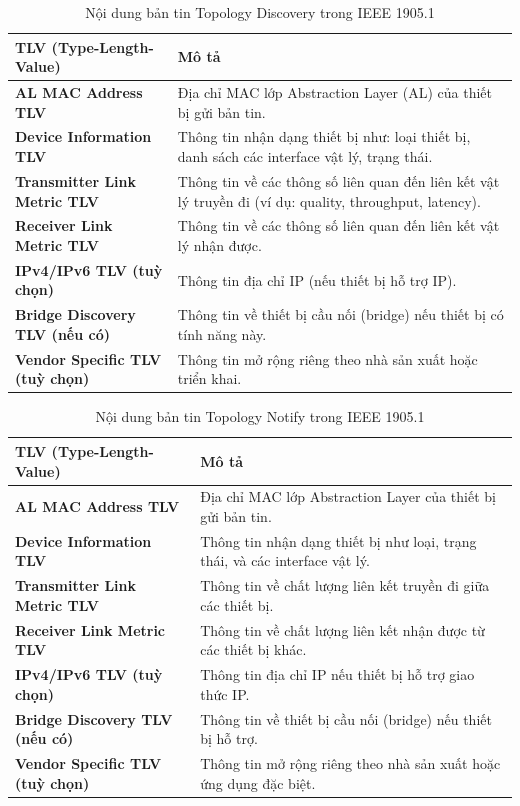 \begin{table}[ht]
    \centering
    \caption{Nội dung bản tin Topology Discovery trong IEEE 1905.1}
    \begin{tabular}{|>{\raggedright\arraybackslash}m{5cm}|>{\raggedright\arraybackslash}m{8cm}|}
    \hline
    \textbf{TLV (Type-Length-Value)} & \textbf{Mô tả} \\
    \hline
    \textbf{AL MAC Address TLV} & Địa chỉ MAC lớp Abstraction Layer (AL) của thiết bị gửi bản tin. \\
    \hline
    \textbf{Device Information TLV} & Thông tin nhận dạng thiết bị như: loại thiết bị, danh sách các interface vật lý, trạng thái. \\
    \hline
    \textbf{Transmitter Link Metric TLV} & Thông tin về các thông số liên quan đến liên kết vật lý truyền đi (ví dụ: quality, throughput, latency). \\
    \hline
    \textbf{Receiver Link Metric TLV} & Thông tin về các thông số liên quan đến liên kết vật lý nhận được. \\
    \hline
    \textbf{IPv4/IPv6 TLV (tuỳ chọn)} & Thông tin địa chỉ IP (nếu thiết bị hỗ trợ IP). \\
    \hline
    \textbf{Bridge Discovery TLV (nếu có)} & Thông tin về thiết bị cầu nối (bridge) nếu thiết bị có tính năng này. \\
    \hline
    \textbf{Vendor Specific TLV (tuỳ chọn)} & Thông tin mở rộng riêng theo nhà sản xuất hoặc triển khai. \\
    \hline
    \end{tabular}
\end{table}
    
\begin{table}[ht]
    \centering
    \caption{Nội dung bản tin Topology Notify trong IEEE 1905.1}
    \begin{tabular}{|>{\raggedright\arraybackslash}m{5cm}|>{\raggedright\arraybackslash}m{8cm}|}
    \hline
    \textbf{TLV (Type-Length-Value)} & \textbf{Mô tả} \\
    \hline
    \textbf{AL MAC Address TLV} & Địa chỉ MAC lớp Abstraction Layer của thiết bị gửi bản tin. \\
    \hline
    \textbf{Device Information TLV} & Thông tin nhận dạng thiết bị như loại, trạng thái, và các interface vật lý. \\
    \hline
    \textbf{Transmitter Link Metric TLV} & Thông tin về chất lượng liên kết truyền đi giữa các thiết bị. \\
    \hline
    \textbf{Receiver Link Metric TLV} & Thông tin về chất lượng liên kết nhận được từ các thiết bị khác. \\
    \hline
    \textbf{IPv4/IPv6 TLV (tuỳ chọn)} & Thông tin địa chỉ IP nếu thiết bị hỗ trợ giao thức IP. \\
    \hline
    \textbf{Bridge Discovery TLV (nếu có)} & Thông tin về thiết bị cầu nối (bridge) nếu thiết bị hỗ trợ. \\
    \hline
    \textbf{Vendor Specific TLV (tuỳ chọn)} & Thông tin mở rộng riêng theo nhà sản xuất hoặc ứng dụng đặc biệt. \\
    \hline
    \end{tabular}
\end{table}

